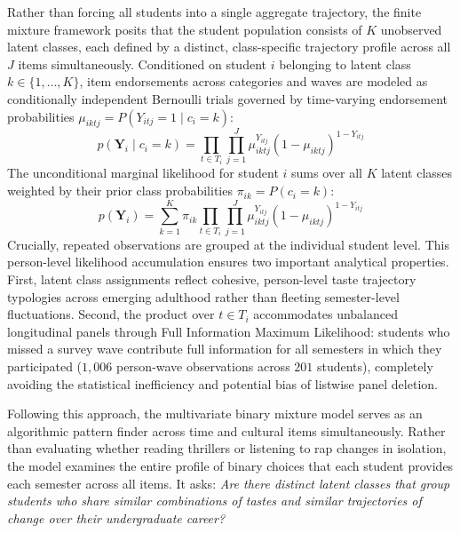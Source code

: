 \documentclass[12pt]{article}
\begin{document}
Rather than forcing all students into a single aggregate trajectory, the finite mixture framework posits that the student population consists of $K$ unobserved latent classes, each defined by a distinct, class-specific trajectory profile across all $J$ items simultaneously. Conditioned on student $i$ belonging to latent class $k \in \{1, \dots, K\}$, item endorsements across categories and waves are modeled as conditionally independent Bernoulli trials governed by time-varying endorsement probabilities $\mu_{iktj} = P(Y_{itj} = 1 \mid c_i = k)$:
\begin{equation}
p(\mathbf{Y}_i \mid c_i = k) = \prod_{t \in T_i} \prod_{j=1}^{J} \mu_{iktj}^{Y_{itj}} (1 - \mu_{iktj})^{1 - Y_{itj}}
\end{equation}
The unconditional marginal likelihood for student $i$ sums over all $K$ latent classes weighted by their prior class probabilities $\pi_{ik} = P(c_i = k)$:
\begin{equation}
p(\mathbf{Y}_i) = \sum_{k=1}^K \pi_{ik} \prod_{t \in T_i} \prod_{j=1}^{J} \mu_{iktj}^{Y_{itj}} (1 - \mu_{iktj})^{1 - Y_{itj}}
\end{equation}
Crucially, repeated observations are grouped at the individual student level. This person-level likelihood accumulation ensures two important analytical properties. First, latent class assignments reflect cohesive, person-level taste trajectory typologies across emerging adulthood rather than fleeting semester-level fluctuations. Second, the product over $t \in T_i$ accommodates unbalanced longitudinal panels through Full Information Maximum Likelihood: students who missed a survey wave contribute full information for all semesters in which they participated ($1,006$ person-wave observations across $201$ students), completely avoiding the statistical inefficiency and potential bias of listwise panel deletion.

Following this approach, the multivariate binary mixture model serves as an algorithmic pattern finder across time and cultural items simultaneously. Rather than evaluating whether reading thrillers or listening to rap changes in isolation, the model examines the entire profile of binary choices that each student provides each semester across all items. It asks: \textit{Are there distinct latent classes that group students who share similar combinations of tastes and similar trajectories of change over their undergraduate career?} 
\end{document}
